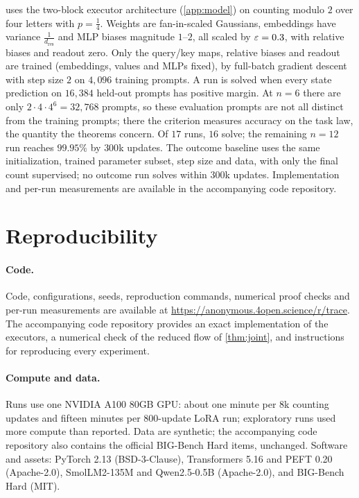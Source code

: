  uses the two-block executor architecture (\cref{app:model}) on counting modulo $2$ over four letters with $p=\tfrac{1}{4}$.
Weights are fan-in-scaled Gaussians, embeddings have variance $\frac{1}{d_{\mathrm{res}}}$ and MLP biases magnitude $1$--$2$, all scaled by
$\varepsilon=0.3$, with relative biases and readout zero. Only the query/key maps, relative biases and readout are trained (embeddings,
values and MLPs fixed), by full-batch gradient descent with step size $2$ on $4{,}096$ training prompts. A run is solved when every state
prediction on $16{,}384$ held-out prompts has positive margin. At $n=6$ there are only $2\cdot4\cdot4^6=32{,}768$ prompts, so these evaluation
prompts are not all distinct from the training prompts; there the criterion measures accuracy on the task law, the quantity the theorems concern.
Of $17$ runs, $16$ solve; the remaining $n=12$ run reaches $99.95\%$ by $300$k updates. The outcome baseline uses the same
initialization, trained parameter subset, step size and data, with only the final count supervised; no outcome run
solves within $300$k updates. Implementation and per-run measurements are available in the accompanying code repository.

\section{Reproducibility}
\label{app:reproducibility}

\paragraph{Code.} Code, configurations, seeds, reproduction commands, numerical proof checks and per-run measurements are available at
\url{https://anonymous.4open.science/r/trace}. The accompanying code repository provides an exact implementation of the executors,
a numerical check of the reduced flow of \cref{thm:joint}, and instructions for reproducing every experiment.

\paragraph{Compute and data.} Runs use one NVIDIA A100 80GB GPU: about one minute per $8$k counting updates and fifteen minutes per
$800$-update LoRA run; exploratory runs used more compute than reported. Data are synthetic; the accompanying code repository also
contains the official BIG-Bench Hard items, unchanged. Software and assets: PyTorch 2.13 (BSD-3-Clause), Transformers 5.16 and PEFT 0.20 (Apache-2.0), SmolLM2-135M
\citep{allal2025smollm2} and Qwen2.5-0.5B \citep{qwen2025qwen25} (Apache-2.0), and BIG-Bench Hard \citep{suzgun2022challenging} (MIT).
